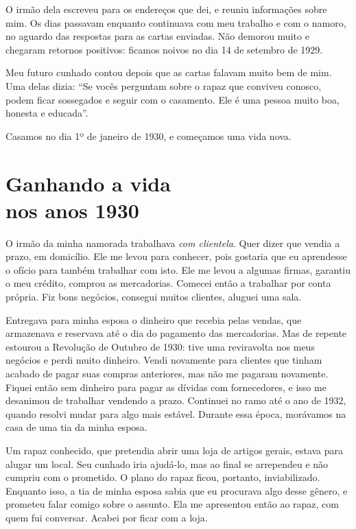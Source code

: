 O irmão dela escreveu para os endereços que dei, e reuniu informações
sobre mim. Os dias passavam enquanto continuava com meu
trabalho e com o namoro, no aguardo das respostas para as cartas enviadas. Não
demorou muito e chegaram retornos positivos: ficamos noivos no dia 14 de
setembro de 1929.

Meu futuro cunhado contou depois que as cartas falavam muito bem de mim. Uma delas dizia: ``Se vocês perguntam sobre o rapaz que conviveu
conosco, podem ficar sossegados e seguir com o casamento. Ele é uma pessoa
muito boa, honesta e educada''.

Casamos no dia 1º de janeiro de 1930, e começamos uma vida nova.

\chapter*{Ganhando a vida\\nos anos 1930}

O irmão da minha namorada trabalhava \textit{com clientela}. Quer dizer que vendia a
prazo, em domicílio. Ele me levou para conhecer, pois gostaria que eu aprendesse o ofício
para também trabalhar com isto. Ele me levou a algumas firmas, garantiu o meu crédito, comprou as
mercadorias. Comecei então a trabalhar por conta própria. Fiz bons
negócios, consegui muitos clientes, aluguei uma sala. 

Entregava para minha esposa o dinheiro que recebia pelas vendas, que
armazenava e reservava até o dia do pagamento das mercadorias. Mas de repente estourou a
Revolução de Outubro de 1930: tive uma reviravolta nos meus negócios
e perdi muito dinheiro. Vendi novamente para clientes que tinham acabado de
pagar suas compras anteriores, mas não me pagaram novamente. Fiquei então sem
dinheiro para pagar as dívidas com fornecedores, e isso me desanimou de trabalhar vendendo a prazo.
Continuei no ramo até o ano de 1932, quando resolvi mudar para algo mais estável. Durante essa época, morávamos na casa de uma tia da minha esposa. 

Um rapaz conhecido, que pretendia abrir uma loja de artigos gerais, estava para alugar um
local. Seu cunhado iria ajudá-lo, mas ao final se arrependeu e não cumpriu com
o prometido. O plano do rapaz ficou, portanto, inviabilizado. Enquanto isso, a tia de 
minha esposa sabia que eu procurava algo desse gênero, e prometeu falar comigo sobre o assunto. 
Ela me apresentou então ao rapaz, com quem fui conversar. Acabei por ficar com a loja. 

